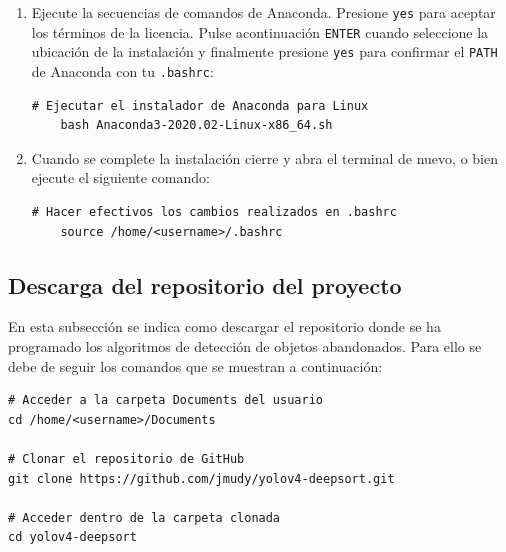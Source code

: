 \begin{enumerate}
    \item Ejecute la secuencias de comandos de Anaconda. Presione \texttt{yes} para aceptar los términos de la licencia. Pulse acontinuación \texttt{ENTER} cuando seleccione la ubicación de la instalación y finalmente presione \texttt{yes} para confirmar el \texttt{PATH} de Anaconda con tu \texttt{.bashrc}:
    
    \vspace{0.5cm}
    
    \begin{lstlisting}[language=iPython,caption=Ejecutar el instalador de Anaconda para Linux,captionpos=b,label={lst:install-conda}]
    # Ejecutar el instalador de Anaconda para Linux
    bash Anaconda3-2020.02-Linux-x86_64.sh
    \end{lstlisting}
    
    \item Cuando se complete la instalación cierre y abra el terminal de nuevo, o bien ejecute el siguiente comando:
    
    \vspace{0.5cm}
    
    \begin{lstlisting}[language=iPython,caption=Hacer efectivo los cambios en el fichero .bashrc,captionpos=b,label={lst:source-bashrc}]
    # Hacer efectivos los cambios realizados en .bashrc
    source /home/<username>/.bashrc
    \end{lstlisting}
\end{enumerate}

\subsection{Descarga del repositorio del proyecto}
\label{subsec:descarga-repo}

En esta subsección se indica como descargar el repositorio donde se ha programado los algoritmos de detección de objetos abandonados. Para ello se debe de seguir los comandos que se muestran a continuación:

\vspace{0.5cm}

\begin{lstlisting}[language=iPython,caption=Descarga repositorio,captionpos=b,label={lst:descarga-repo}]
# Acceder a la carpeta Documents del usuario
cd /home/<username>/Documents

# Clonar el repositorio de GitHub
git clone https://github.com/jmudy/yolov4-deepsort.git

# Acceder dentro de la carpeta clonada
cd yolov4-deepsort
\end{lstlisting}

